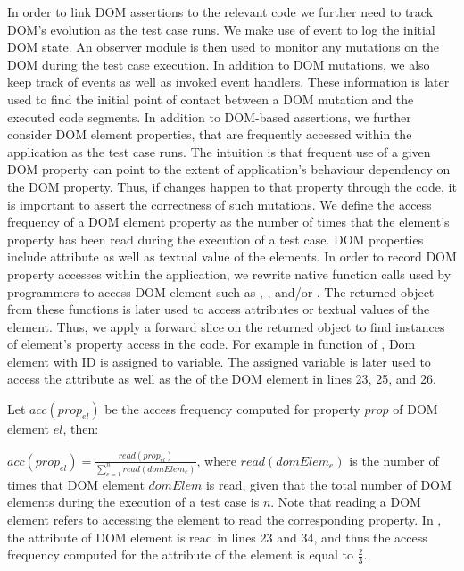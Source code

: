 In order to link DOM assertions to the relevant \javascript code we further need to track DOM's evolution as the test case runs. We make use of  event to log the initial DOM state. An observer module is then used to monitor any mutations on the DOM during the test case execution. In addition to DOM mutations, we also keep track of \javascript events as well as invoked event handlers. These information is later used to find the initial point of contact between a DOM mutation and the executed code segments. 
In addition to DOM-based assertions, we further consider DOM element properties, that are frequently accessed within the application as the test case runs. The intuition is that frequent use of a given DOM property can point to the extent of application's behaviour dependency on the DOM property. Thus, if changes happen to that property through the \javascript code, it is important to assert the correctness of such mutations. We define the access frequency of a DOM element property as the number of times that the element's property has been read during the execution of a test case. DOM properties include attribute as well as textual value of the elements.
In order to record DOM property accesses within the application, we rewrite native function calls used by programmers to access DOM element such as , , and/or . The returned object from these functions is later used to access attributes or textual values of the element. Thus, we apply a forward slice on the returned object to find instances of element's property access in the code.
For example in function  of , Dom element with ID  is assigned to  variable. The assigned variable is later used to access the  attribute as well as the 
of the DOM element in lines 23, 25, and 26.

Let $acc(prop_{el})$ be the access frequency computed for property $prop$ of DOM element $el$, then:
 
$acc(prop_{el})=\frac{read(prop_{el})}{\sum _{e=1}^{n} read(domElem_e)}$, where $read(domElem_{e})$ is the number of times that DOM element $domElem$ is read, given that the total number of DOM elements during the execution of a test case is $n$.
Note that reading a DOM element refers to accessing the element to read the corresponding property. In , the  attribute of DOM element  is read in lines 23 and 34, and thus the access frequency
computed for the  attribute of the element is equal to $\frac{2}{3}$.

